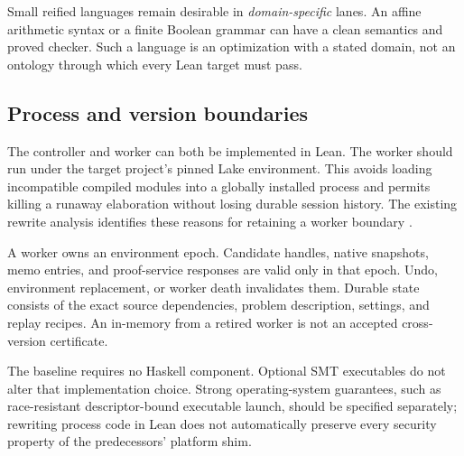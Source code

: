 Small reified languages remain desirable in \emph{domain-specific} lanes. An affine arithmetic syntax or a finite Boolean grammar can have a clean semantics and proved checker. Such a language is an optimization with a stated domain, not an ontology through which every Lean target must pass.

\subsection{Process and version boundaries}

The controller and worker can both be implemented in Lean. The worker should run under the target project's pinned Lake environment. This avoids loading incompatible compiled modules into a globally installed process and permits killing a runaway elaboration without losing durable session history. The existing rewrite analysis identifies these reasons for retaining a worker boundary \cite{rewrite-analysis}.

A worker owns an environment epoch. Candidate handles, native snapshots, memo entries, and proof-service responses are valid only in that epoch. Undo, environment replacement, or worker death invalidates them. Durable state consists of the exact source dependencies, problem description, settings, and replay recipes. An in-memory  from a retired worker is not an accepted cross-version certificate.

The baseline requires no Haskell component. Optional SMT executables do not alter that implementation choice. Strong operating-system guarantees, such as race-resistant descriptor-bound executable launch, should be specified separately; rewriting process code in Lean does not automatically preserve every security property of the predecessors' platform shim.
